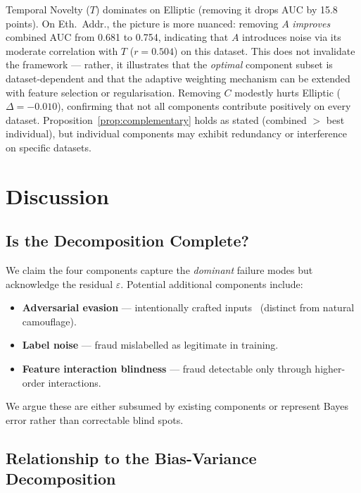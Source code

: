 \documentclass[journal]{IEEEtran}
\begin{document}
Temporal Novelty ($T$) dominates on Elliptic (removing it drops AUC by 15.8 points). On Eth.\ Addr., the picture is more nuanced: removing $A$ \emph{improves} combined AUC from 0.681 to 0.754, indicating that $A$ introduces noise via its moderate correlation with $T$ ($r = 0.504$) on this dataset. This does not invalidate the framework --- rather, it illustrates that the \emph{optimal} component subset is dataset-dependent and that the adaptive weighting mechanism can be extended with feature selection or regularisation. Removing $C$ modestly hurts Elliptic ($\Delta = -0.010$), confirming that not all components contribute positively on every dataset. Proposition~\ref{prop:complementary} holds as stated (combined $>$ best individual), but individual components may exhibit redundancy or interference on specific datasets.

\section{Discussion}
\label{sec:discussion}

\subsection{Is the Decomposition Complete?}

We claim the four components capture the \textit{dominant} failure modes but acknowledge the residual $\varepsilon$. Potential additional components include:

\begin{itemize}
  \item \textbf{Adversarial evasion} --- intentionally crafted inputs~\cite{goodfellow2015} (distinct from natural camouflage).
  \item \textbf{Label noise} --- fraud mislabelled as legitimate in training.
  \item \textbf{Feature interaction blindness} --- fraud detectable only through higher-order interactions.
\end{itemize}

We argue these are either subsumed by existing components or represent Bayes error rather than correctable blind spots.

\subsection{Relationship to the Bias-Variance Decomposition}
\end{document}
